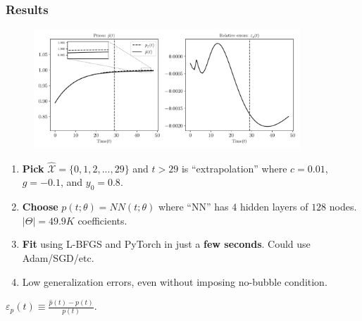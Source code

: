 \documentclass[aspectratio=169,10pt]{beamer}
\newcommand{\emphcolor}[1]{\textbf{\textcolor{emphcolorval}{#1}}}
\newcommand{\Xtrain}{\hat{\mathcal{X}}}
\begin{document}
\begin{frame}
	\frametitle{Results}
	\begin{figure}[htb]
		\includegraphics[width=10cm]{./figures/asset_seq_g0.pdf}
	\end{figure}
	\begin{enumerate}
		\item \emphcolor{Pick} $\Xtrain =\{0,1,2,...,29\}$ and $t > 29$ is ``extrapolation'' where $c=0.01$, $g = -0.1$, and $y_0 = 0.8$.
		\item \emphcolor{Choose} $p(t;\theta) = NN(t;\theta)$ where ``NN'' has $4$ hidden layers of $128$ nodes. $|\Theta| = 49.9 K$ coefficients.
		\item \emphcolor{Fit} using L-BFGS and PyTorch in just a \emphcolor{few seconds}. Could use Adam/SGD/etc.
		\item Low generalization errors, even without imposing no-bubble condition.
	\end{enumerate}
	\begin{center}
			$\varepsilon_p(t)\equiv \frac{\hat{p}(t)-p(t)}{p(t)}$.
	\end{center}
\end{frame}
\end{document}
